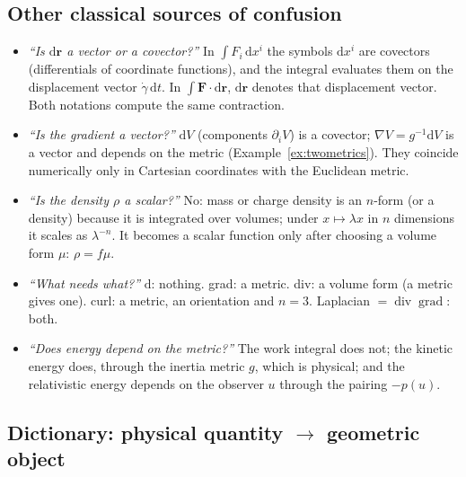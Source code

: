 \documentclass[11pt,a4paper]{article}
\numberwithin{equation}{section}
\theoremstyle{definition}
\theoremstyle{plain}
\newcommand{\dd}{\mathrm{d}}
\begin{document}
\subsection{Other classical sources of confusion}\label{sec:phys-confusion}

\begin{itemize}
\item \emph{``Is $\dd\mathbf r$ a vector or a covector?''} In $\int F_i\,\dd x^i$ the symbols $\dd x^i$ are covectors (differentials of coordinate functions), and the integral evaluates them on the displacement vector $\dot\gamma\,\dd t$. In $\int\mathbf F\cdot\dd\mathbf r$, $\dd\mathbf r$ denotes that displacement vector. Both notations compute the same contraction.
\item \emph{``Is the gradient a vector?''} $\dd V$ (components $\partial_iV$) is a covector; $\nabla V=g^{-1}\dd V$ is a vector and depends on the metric (Example~\ref{ex:twometrics}). They coincide numerically only in Cartesian coordinates with the Euclidean metric.
\item \emph{``Is the density $\rho$ a scalar?''} No: mass or charge density is an $n$-form (or a density) because it is integrated over volumes; under $x\mapsto\lambda x$ in $n$ dimensions it scales as $\lambda^{-n}$. It becomes a scalar function only after choosing a volume form $\mu$: $\rho=f\mu$.
\item \emph{``What needs what?''} $\dd$: nothing. grad: a metric. div: a volume form (a metric gives one). curl: a metric, an orientation and $n=3$. Laplacian $=\operatorname{div}\operatorname{grad}$: both.
\item \emph{``Does energy depend on the metric?''} The work integral does not; the kinetic energy does, through the inertia metric $g$, which is physical; and the relativistic energy depends on the observer $u$ through the pairing $-p(u)$.
\end{itemize}

\subsection{Dictionary: physical quantity $\to$ geometric object}\label{sec:phys-dict}
\end{document}
